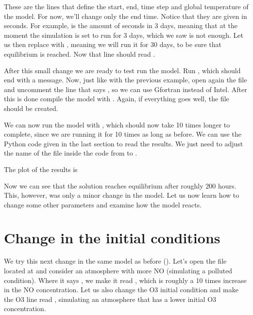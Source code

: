 \documentclass[letterpaper,10pt,openany,oneside]{sphinxmanual}
\begin{document}
These are the lines that define the start, end, time step and global
temperature of the model. For now, we'll change only the end time. Notice that
they are given in seconds. For example,  is the amount of seconds
in 3 days, meaning that at the moment the simulation is set to run for 3 days,
which we saw is not enough.  Let us then replace  with , meaning we
will run it for 30 days, to be sure that equilibrium is reached. Now that line
should read .

After this small change we are ready to test run the model. Run , which should end with a 
message. Now, just like with the previous example, open again the file
 and uncomment the line that says , so we can use Gfortran instead of Intel. After this is done compile
the model with . Again, if everything goes well,
the  file should be created.

We can now run the model with , which should now take 10
times longer to complete, since we are running it for 10 times as long as
before.  We can use the Python code given in the last section to read the
results. We just need to adjust the name of the file inside the code from
 to .

The plot of the results is
\label{improving:test2-time}\begin{figure}[htbp]
\centering

\noindent{}
\label{improving:test2-time}\end{figure}

Now we can see that the solution reaches equilibrium after roughly 200 hours.
This, however, was only a minor change in the model. Let us now learn how to
change some other parameters and examine how the model reacts.


\section{Change in the initial conditions}
\label{improving:change-in-the-initial-conditions}
We try this next change in the same model as before (). Let's open
the  file located at  and consider an
atmosphere with more NO (simulating a polluted condition). Where it says , we make it read , which is roughly a 10 times
increase in the NO concentration. Let us also change the O3 initial condition
and make the O3 line read , simulating an atmosphere that
has a lower initial O3 concentration.
\end{document}
